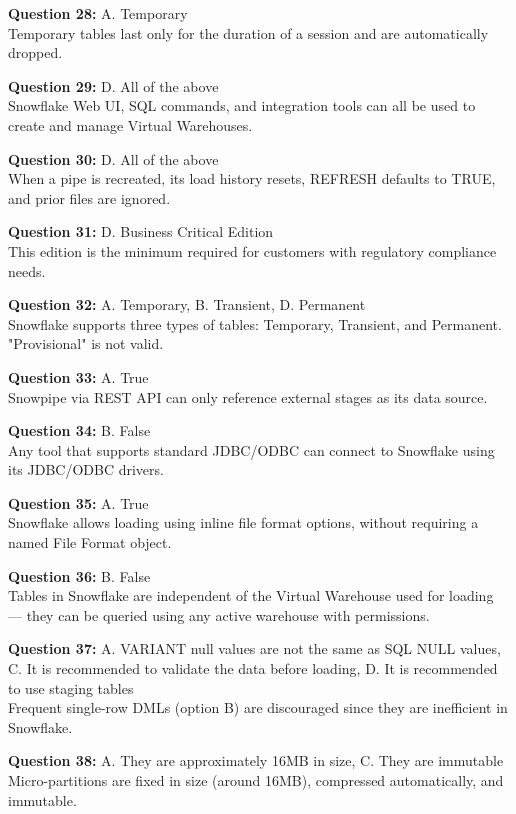 \documentclass[12pt]{article}
\begin{document}
\textbf{Question 28:} A. Temporary \\
Temporary tables last only for the duration of a session and are automatically dropped.

\textbf{Question 29:} D. All of the above \\
Snowflake Web UI, SQL commands, and integration tools can all be used to create and manage Virtual Warehouses.

\textbf{Question 30:} D. All of the above \\
When a pipe is recreated, its load history resets, REFRESH defaults to TRUE, and prior files are ignored.

\textbf{Question 31:} D. Business Critical Edition \\
This edition is the minimum required for customers with regulatory compliance needs.

\textbf{Question 32:} A. Temporary, B. Transient, D. Permanent \\
Snowflake supports three types of tables: Temporary, Transient, and Permanent. "Provisional" is not valid.

\textbf{Question 33:} A. True \\
Snowpipe via REST API can only reference external stages as its data source.

\textbf{Question 34:} B. False \\
Any tool that supports standard JDBC/ODBC can connect to Snowflake using its JDBC/ODBC drivers.

\textbf{Question 35:} A. True \\
Snowflake allows loading using inline file format options, without requiring a named File Format object.

\textbf{Question 36:} B. False \\
Tables in Snowflake are independent of the Virtual Warehouse used for loading — they can be queried using any active warehouse with permissions.

\textbf{Question 37:} A. VARIANT null values are not the same as SQL NULL values, 
C. It is recommended to validate the data before loading, 
D. It is recommended to use staging tables \\
Frequent single-row DMLs (option B) are discouraged since they are inefficient in Snowflake.

\textbf{Question 38:} A. They are approximately 16MB in size, C. They are immutable \\
Micro-partitions are fixed in size (around 16MB), compressed automatically, and immutable.
\end{document}
